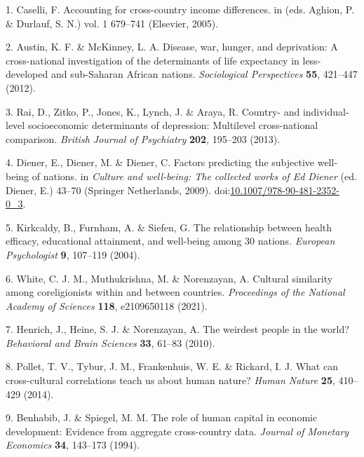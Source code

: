 \documentclass[
  english,
  man,floatsintext]{apa6}
\begin{document}
\hypertarget{refs}{}
\leavevmode\hypertarget{ref-Caselli2005}{}%
1. Caselli, F. Accounting for cross-country income differences. in (eds. Aghion, P. \& Durlauf, S. N.) vol. 1 679--741 (Elsevier, 2005).

\leavevmode\hypertarget{ref-Austin2012}{}%
2. Austin, K. F. \& McKinney, L. A. Disease, war, hunger, and deprivation: A cross-national investigation of the determinants of life expectancy in less-developed and sub-Saharan African nations. \emph{Sociological Perspectives} \textbf{55}, 421--447 (2012).

\leavevmode\hypertarget{ref-Rai2013}{}%
3. Rai, D., Zitko, P., Jones, K., Lynch, J. \& Araya, R. Country- and individual-level socioeconomic determinants of depression: Multilevel cross-national comparison. \emph{British Journal of Psychiatry} \textbf{202}, 195--203 (2013).

\leavevmode\hypertarget{ref-Diener2009}{}%
4. Diener, E., Diener, M. \& Diener, C. Factors predicting the subjective well-being of nations. in \emph{Culture and well-being: The collected works of Ed Diener} (ed. Diener, E.) 43--70 (Springer Netherlands, 2009). doi:\href{https://doi.org/10.1007/978-90-481-2352-0_3}{10.1007/978-90-481-2352-0\_3}.

\leavevmode\hypertarget{ref-Kirkcaldy2004}{}%
5. Kirkcaldy, B., Furnham, A. \& Siefen, G. The relationship between health efficacy, educational attainment, and well-being among 30 nations. \emph{European Psychologist} \textbf{9}, 107--119 (2004).

\leavevmode\hypertarget{ref-White2021}{}%
6. White, C. J. M., Muthukrishna, M. \& Norenzayan, A. Cultural similarity among coreligionists within and between countries. \emph{Proceedings of the National Academy of Sciences} \textbf{118}, e2109650118 (2021).

\leavevmode\hypertarget{ref-Henrich2010}{}%
7. Henrich, J., Heine, S. J. \& Norenzayan, A. The weirdest people in the world? \emph{Behavioral and Brain Sciences} \textbf{33}, 61--83 (2010).

\leavevmode\hypertarget{ref-Pollet2014}{}%
8. Pollet, T. V., Tybur, J. M., Frankenhuis, W. E. \& Rickard, I. J. What can cross-cultural correlations teach us about human nature? \emph{Human Nature} \textbf{25}, 410--429 (2014).

\leavevmode\hypertarget{ref-Benhabib1994}{}%
9. Benhabib, J. \& Spiegel, M. M. The role of human capital in economic development: Evidence from aggregate cross-country data. \emph{Journal of Monetary Economics} \textbf{34}, 143--173 (1994).
\end{document}
